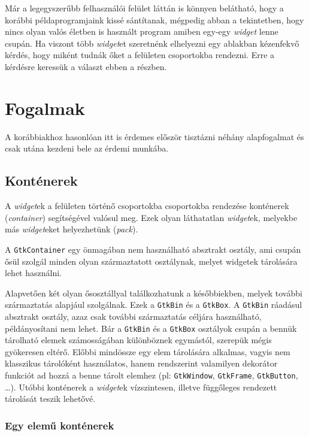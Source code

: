 Már a legegyszerűbb felhasználói felület láttán is könnyen belátható, hogy a korábbi példaprogramjaink kissé sántítanak, mégpedig abban a tekintetben, hogy nincs olyan valós életben is használt program amiben egy-egy \textit{widget} lenne csupán. Ha viszont több \textit{widget}et szeretnénk elhelyezni egy ablakban kézenfekvő kérdés, hogy miként tudnák őket a felületen csoportokba rendezni. Erre a kérdésre keressük a választ ebben a részben.

\section{Fogalmak}

A korábbiakhoz hasonlóan itt is érdemes először tisztázni néhány alapfogalmat és csak utána kezdeni bele az érdemi munkába.

\subsection{Konténerek}

A \textit{widget}ek a felületen történő csoportokba csoportokba rendezése konténerek (\textit{container}) segítségével valósul meg. Ezek olyan láthatatlan \textit{widget}ek, melyekbe más \textit{widget}eket helyezhetünk (\textit{pack}).

A \texttt{GtkContainer} egy önmagában nem használható absztrakt osztály, ami csupán ősül szolgál minden olyan származtatott osztálynak, melyet widgetek tárolására lehet használni.

Alapvetően két olyan ősosztállyal találkozhatunk a későbbiekben, melyek további származtatás alapjául szolgálnak. Ezek a \texttt{GtkBin} és a \texttt{GtkBox}. A \texttt{GtkBin} ráadásul absztrakt osztály, azaz csak további származtatás céljára használható, példányosítani nem lehet. Bár a \texttt{GtkBin} és a \texttt{GtkBox} osztályok csupán a bennük tárolható elemek számosságában különböznek egymástól, szerepük mégis gyökeresen eltérő. Előbbi mindössze egy elem tárolására alkalmas, vagyis  nem klasszikus tárolóként használatos, hanem rendszerint valamilyen dekorátor funkciót ad hozzá a benne tárolt elemhez (pl: \texttt{GtkWindow}, \texttt{GtkFrame}, \texttt{GtkButton}, \dots). Utóbbi konténerek a \textit{widget}ek vízszintesen, illetve függőleges rendezett tárolását teszik lehetővé.

\subsubsection{Egy elemű konténerek}

